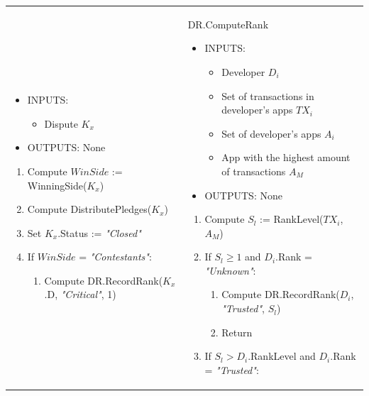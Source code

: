 \begin{table}[H]
\begin{tabular}{|p{}p{}|}
\begin{itemize}
	\item INPUTS:
	\vspace{-0.3cm}
	\begin{itemize}
		\item Dispute $K_x$
	\end{itemize}
	\item OUTPUTS: None
\end{itemize}
\begin{enumerate}
	\item Compute $WinSide$ := \textsf{WinningSide}($K_x$)
	\item Compute \textsf{DistributePledges}($K_x$)
	\item Set $K_x$.Status := \textit{"Closed"}
	\item If $WinSide$ = \textit{"Contestants"}:
	\begin{enumerate}
		\item Compute \textsf{DR.RecordRank}($K_x$.D, \textit{"Critical"}, 1)
	\end{enumerate}
\end{enumerate} & \vspace{0.1cm}
\textsf{DR.ComputeRank} 
\vspace{-0.3cm}
\begin{itemize}
	\item INPUTS:
	\vspace{-0.3cm}
	\begin{itemize}
		\item Developer $D_i$
		\item Set of transactions in developer's apps $TX_i$
		\item Set of developer's apps $A_i$
		\item App with the highest amount of transactions $A_M$
	\end{itemize}
	\item OUTPUTS: None
\end{itemize}
\begin{enumerate}
	\item Compute $S_l$ := \textsf{RankLevel}($TX_i$, $A_M$)
	\item If $S_l \geq 1$ and $D_i$.Rank = \textit{"Unknown"}:
	\begin{enumerate}
		\item Compute \textsf{DR.RecordRank}($D_i$, \textit{"Trusted"}, $S_l$)
		\item Return
	\end{enumerate}
	\item If $S_l > D_i$.RankLevel and $D_i$.Rank = \textit{"Trusted"}:

\end{enumerate}
\end{tabular}
\end{table}
